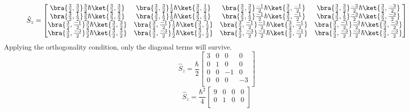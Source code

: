 \documentclass{article}
\begin{document}
\begin{enumerate}
		\begingroup
		\renewcommand*{\arraystretch}{1.5}
		\begin{equation}
			\hat{S}_z =
			\begin{bmatrix}
				\bra{\frac{3}{2},\frac{3}{2}} \frac{3}{2}\hbar \ket{\frac{3}{2},\frac{3}{2}} & \bra{\frac{3}{2},\frac{3}{2}} \frac{1}{2}\hbar \ket{\frac{3}{2},\frac{1}{2}} &
				\bra{\frac{3}{2},\frac{3}{2}} \frac{-1}{2}\hbar \ket{\frac{3}{2},\frac{-1}{2}} & \bra{\frac{3}{2},\frac{3}{2}} \frac{-3}{2}\hbar \ket{\frac{3}{2},\frac{-3}{2}} \\
				\bra{\frac{3}{2},\frac{1}{2}} \frac{3}{2}\hbar \ket{\frac{3}{2},\frac{3}{2}} & \bra{\frac{3}{2},\frac{1}{2}} \frac{1}{2}\hbar \ket{\frac{3}{2},\frac{1}{2}} &
				\bra{\frac{3}{2},\frac{1}{2}} \frac{-1}{2}\hbar \ket{\frac{3}{2},\frac{-1}{2}} & \bra{\frac{3}{2},\frac{1}{2}} \frac{-3}{2}\hbar \ket{\frac{3}{2},\frac{-3}{2}} \\
				\bra{\frac{3}{2},\frac{-1}{2}} \frac{3}{2}\hbar \ket{\frac{3}{2},\frac{3}{2}} & \bra{\frac{3}{2},\frac{-1}{2}} \frac{1}{2}\hbar \ket{\frac{3}{2},\frac{1}{2}} &
				\bra{\frac{3}{2},\frac{-1}{2}} \frac{-1}{2}\hbar \ket{\frac{3}{2},\frac{-1}{2}} & \bra{\frac{3}{2},\frac{-1}{2}} \frac{-3}{2}\hbar \ket{\frac{3}{2},\frac{-3}{2}} \\
				\bra{\frac{3}{2},\frac{-3}{2}} \frac{3}{2}\hbar \ket{\frac{3}{2},\frac{3}{2}} & \bra{\frac{3}{2},\frac{-3}{2}} \frac{1}{2}\hbar \ket{\frac{3}{2},\frac{1}{2}} &
				\bra{\frac{3}{2},\frac{-3}{2}} \frac{-1}{2}\hbar \ket{\frac{3}{2},\frac{-1}{2}} & \bra{\frac{3}{2},\frac{-3}{2}} \frac{-3}{2}\hbar \ket{\frac{3}{2},\frac{-3}{2}} \\
			\end{bmatrix}
		\end{equation}
		Applying the orthogonality condition, only the diagonal terms will survive.
		\begin{equation}
			\hat{S}_z = \frac{\hbar}{2}
			\begin{bmatrix}
				3 & 0 & 0 & 0 \\
				0 & 1 & 0 & 0 \\
				0 & 0 &	-1 & 0 \\
				0 & 0 & 0 & -3 \\
			\end{bmatrix}
		\end{equation}
		\begin{equation}
			\hat{S}_z = \frac{\hbar^2}{4}
			\begin{bmatrix}
				9 & 0 & 0 & 0 \\
				0 & 1 & 0 & 0 \\

\end{bmatrix}
\end{equation}
\end{enumerate}
\end{document}
